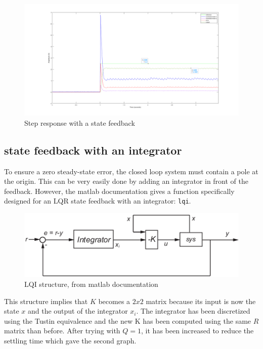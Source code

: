 \begin{figure}[H]
    \centering
    \includegraphics[width = \textwidth]{Pictures/without_PI.png}
    \caption{Step response with a state feedback}
    \label{fig:state feedback step response}
\end{figure}

\subsection{state feedback with an integrator}

To ensure a zero steady-state error, the closed loop system must contain a pole at the origin. This can be very easily 
done by adding an integrator in front of the feedback. However, the matlab documentation gives a function specifically
designed for an LQR state feedback with an integrator: \texttt{lqi}.

\begin{figure}[H]
    \centering
    \includegraphics[width = \textwidth]{Pictures/lqi_docs.png}
    \caption{LQI structure, from matlab documentation}
    \label{fig:lqi documentation}
\end{figure}

This structure implies that $K$ becomes a $2x2$ matrix because its input is now the state $x$ and the output of the 
integrator $x_i$. The integrator has been discretized using the Tustin equivalence and the new K has been computed using
the same $R$ matrix than before. After trying with $Q = 1$, it has been increased to reduce the settling time which gave
the second graph.

